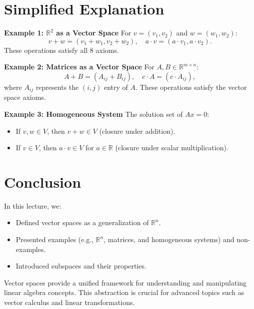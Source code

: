 \documentclass{article}
\begin{document}
\section*{Simplified Explanation}

\textbf{Example 1: $\mathbb{R}^2$ as a Vector Space}
For $v = (v_1, v_2)$ and $w = (w_1, w_2)$:
\[
  v + w = (v_1 + w_1, v_2 + w_2), \quad a \cdot v = (a \cdot v_1, a \cdot v_2).
\]
These operations satisfy all 8 axioms.

\textbf{Example 2: Matrices as a Vector Space}
For $A, B \in \mathbb{R}^{m \times n}$:
\[
  A + B = (A_{ij} + B_{ij}), \quad c \cdot A = (c \cdot A_{ij}),
\]
where $A_{ij}$ represents the $(i,j)$ entry of $A$. These operations satisfy the vector space axioms.

\textbf{Example 3: Homogeneous System}
The solution set of $Ax = 0$:
\begin{itemize}
  \item If $v, w \in V$, then $v + w \in V$ (closure under addition).
  \item If $v \in V$, then $a \cdot v \in V$ for $a \in \mathbb{R}$ (closure under scalar multiplication).
\end{itemize}

\section*{Conclusion}

In this lecture, we:
\begin{itemize}
  \item Defined vector spaces as a generalization of $\mathbb{R}^n$.
  \item Presented examples (e.g., $\mathbb{R}^n$, matrices, and homogeneous systems) and non-examples.
  \item Introduced subspaces and their properties.
\end{itemize}

Vector spaces provide a unified framework for understanding and manipulating linear algebra concepts. This abstraction is crucial for advanced topics such as vector calculus and linear transformations.
\end{document}
